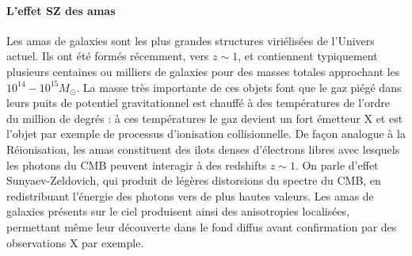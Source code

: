 \paragraph{L'effet SZ des amas}
Les amas de galaxies sont les plus grandes structures viriélisées de l'Univers actuel. Ils ont été formés récemment, vers $z\sim 1$, et contiennent typiquement plusieurs centaines ou milliers de galaxies pour des masses totales approchant les $10^{14}-10^{15} M_\odot$. La masse très importante de ces objets font que le gaz piégé dans leurs puits de potentiel gravitationnel est chauffé à des températures de l'ordre du million de degrés : à ces températures le gaz devient un fort émetteur X et est l'objet par exemple de processus d'ionisation collisionnelle. De façon analogue à la Réionisation, les amas constituent des ilots denses d'électrons libres avec lesquels les photons du CMB peuvent interagir à des redshifts $z\sim 1$. On parle d'effet Sunyaev-Zeldovich, qui produit de légères distorsions du spectre du CMB, en redistribuant l'énergie des photons vers de plus hautes valeurs. Les amas de galaxies présents sur le ciel produisent ainsi des anisotropies localisées, permettant même leur découverte dans le fond diffus avant confirmation par des observations X par exemple.

